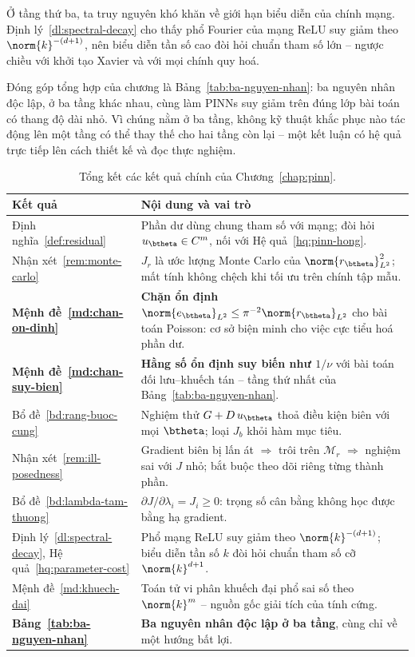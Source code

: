 Ở tầng thứ ba, ta truy nguyên khó khăn về giới hạn biểu diễn của chính mạng.
Định lý~\ref{dl:spectral-decay} cho thấy phổ Fourier của mạng ReLU suy giảm theo
$\norm{k}^{-(d+1)}$, nên biểu diễn tần số cao đòi hỏi chuẩn tham số lớn -- ngược
chiều với khởi tạo Xavier và với mọi chính quy hoá.
 
Đóng góp tổng hợp của chương là Bảng~\ref{tab:ba-nguyen-nhan}: ba nguyên nhân độc
lập, ở ba tầng khác nhau, cùng làm PINNs suy giảm trên đúng lớp bài toán có thang
độ dài nhỏ. Vì chúng nằm ở ba tầng, không kỹ thuật khắc phục nào tác động lên một
tầng có thể thay thế cho hai tầng còn lại -- một kết luận có hệ quả trực tiếp lên
cách thiết kế và đọc thực nghiệm.
 
\begin{table}[htbp]
\centering
\caption{Tổng kết các kết quả chính của Chương~\ref{chap:pinn}.}
\label{tab:tong-ket-4}
\small
\begin{tabular}{@{}l p{8.2cm}@{}}
\toprule
\textbf{Kết quả} & \textbf{Nội dung và vai trò} \\
\midrule
Định nghĩa~\ref{def:residual}
  & Phần dư dùng chung tham số với mạng; đòi hỏi $u_{\btheta}\in C^m$, nối với
    Hệ quả~\ref{hq:pinn-hong}. \\
Nhận xét~\ref{rem:monte-carlo}
  & $J_r$ là ước lượng Monte Carlo của $\norm{r_{\btheta}}_{L^2}^2$; mất tính
    không chệch khi tối ưu trên chính tập mẫu. \\
\textbf{Mệnh đề~\ref{md:chan-on-dinh}}
  & \textbf{Chặn ổn định} $\norm{e_{\btheta}}_{L^2}\le \pi^{-2}
    \norm{r_{\btheta}}_{L^2}$ cho bài toán Poisson: cơ sở biện minh cho việc cực
    tiểu hoá phần dư. \\
\textbf{Mệnh đề~\ref{md:chan-suy-bien}}
  & \textbf{Hằng số ổn định suy biến như $1/\nu$} với bài toán đối lưu--khuếch
    tán -- tầng thứ nhất của Bảng~\ref{tab:ba-nguyen-nhan}. \\
Bổ đề~\ref{bd:rang-buoc-cung}
  & Nghiệm thử $G + D\,u_{\btheta}$ thoả điều kiện biên với mọi $\btheta$; loại
    $J_b$ khỏi hàm mục tiêu. \\
Nhận xét~\ref{rem:ill-posedness}
  & Gradient biên bị lấn át $\Rightarrow$ trôi trên $\mathcal{M}_r$ $\Rightarrow$
    nghiệm sai với $J$ nhỏ; bắt buộc theo dõi riêng từng thành phần. \\
Bổ đề~\ref{bd:lambda-tam-thuong}
  & $\partial J/\partial\lambda_i = J_i \ge 0$: trọng số cân bằng không học được
    bằng hạ gradient. \\
Định lý~\ref{dl:spectral-decay}, Hệ quả~\ref{hq:parameter-cost}
  & Phổ mạng ReLU suy giảm theo $\norm{k}^{-(d+1)}$; biểu diễn tần số $k$ đòi hỏi
    chuẩn tham số cỡ $\norm{k}^{d+1}$. \\
Mệnh đề~\ref{md:khuech-dai}
  & Toán tử vi phân khuếch đại phổ sai số theo $\norm{k}^{m}$ -- nguồn gốc giải
    tích của tính cứng. \\
\textbf{Bảng~\ref{tab:ba-nguyen-nhan}}
  & \textbf{Ba nguyên nhân độc lập ở ba tầng}, cùng chỉ về một hướng bất lợi. \\
\bottomrule
\end{tabular}
\end{table}
 
